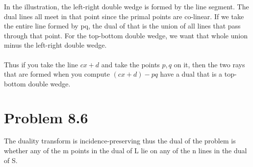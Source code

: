 \documentclass[11pt,psfig]{article}
\begin{document}
In the illustration, the left-right double wedge is formed by the line segment. The dual lines all meet in that point since the primal points are co-linear. If we take the entire line formed by pq, the dual of that is the union of all lines that pass through that point. For the top-bottom double wedge, we want that whole union minus the left-right double wedge. \\
\\
Thus if you take the line $cx + d$ and take the points $p,q$ on it, then the two rays that are formed when you compute $(cx+d)-pq$ have a dual that is a top-bottom double wedge. 

\section*{Problem 8.6}

The duality transform is incidence-preserving thus the dual of the problem is whether any of the m points in the dual of L lie on any of the n lines in the dual of S. 
\end{document}
